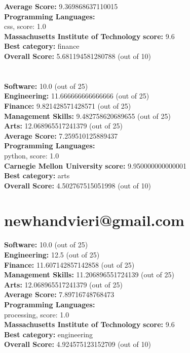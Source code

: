\documentclass{article}
\begin{document}
\textbf{Average Score: } 9.369868637110015\\
\textbf{Programming Languages:} \\
css, score: 1.0\\
\textbf{Massachusetts Institute of Technology} \textbf{score:} 9.6\\
\textbf{Best category: } finance\\
\textbf{Overall Score: }5.681194581280788 (out of 10)\section{}
\textbf{Software:} 10.0 (out of 25)\\
\textbf{Engineering: } 11.666666666666666 (out of 25)\\
\textbf{Finance:} 9.821428571428571 (out of 25)\\
\textbf{Management Skills:} 9.482758620689655 (out of 25)\\
\textbf{Arts:} 12.068965517241379 (out of 25)\\
\textbf{Average Score: } 7.259510125889437\\
\textbf{Programming Languages:} \\
python, score: 1.0\\
\textbf{Carnegie Mellon University} \textbf{score:} 9.950000000000001\\
\textbf{Best category: } arts\\
\textbf{Overall Score: }4.502767515051998 (out of 10)\section{newhandvieri@gmail.com}
\textbf{Software:} 10.0 (out of 25)\\
\textbf{Engineering: } 12.5 (out of 25)\\
\textbf{Finance:} 11.607142857142858 (out of 25)\\
\textbf{Management Skills:} 11.206896551724139 (out of 25)\\
\textbf{Arts:} 12.068965517241379 (out of 25)\\
\textbf{Average Score: } 7.89716748768473\\
\textbf{Programming Languages:} \\
processing, score: 1.0\\
\textbf{Massachusetts Institute of Technology} \textbf{score:} 9.6\\
\textbf{Best category: } engineering\\
\textbf{Overall Score: }4.924575123152709 (out of 10)\section{}
\end{document}
